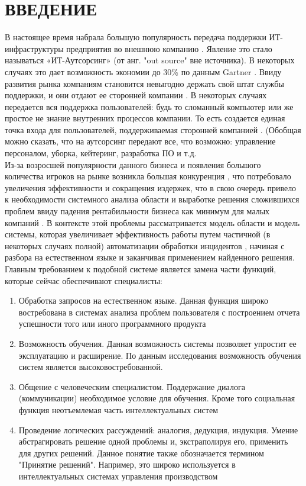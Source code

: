 \chapter*{ВВЕДЕНИЕ}							%

В настоящее время набрала большую популярность передача поддержки ИТ-инфраструктуры предприятия во внешнюю компанию \cite{StartToOutsource}. Явление это стало называться «ИТ-Аутсорсинг» (от анг. "out source" \- вне источника). В некоторых случаях это дает возможность экономии до 30\% по данным Gartner \cite{OutsourceIT}. Ввиду развития рынка компаниям становится невыгодно держать свой штат службы поддержки, и они отдают ее сторонней компании \cite{OutsourceEff}. В некоторых случаях передается вся поддержка пользователей: будь то сломанный компьютер или же простое не знание внутренних процессов компании. То есть создается единая точка входа для пользователей, поддерживаемая сторонней компанией \cite{OutsourceSD}. (Обобщая можно сказать, что на аутсорсинг передают все, что возможно: управление персоналом, уборка, кейтеринг, разработка ПО \cite{OutsourceSoft} и т.д. \\
Из-за возросшей популярности данного бизнеса и появления большого количества игроков на рынке возникла большая конкуренция \cite{AUTOS-1}, что потребовало увеличения эффективности и сокращения издержек, что в свою очередь привело к необходимости системного анализа области и выработке решения сложившихся проблем \cite{AUTOM-1} ввиду падения рентабильности бизнеса как минимум для малых компаний \cite{OUTSOURCE-RENT} \cite{OutsourceEff}. В контексте этой проблемы рассматривается модель области и модель системы, которая увеличивает эффективность работы путем частичной (в некоторых случаях полной) автоматизации обработки инцидентов \cite{SDAUTOM}, начиная с разбора на естественном языке и заканчивая применением найденного решения. \\
Главным требованием к подобной системе является замена части функций, которые сейчас обеспечивают специалисты:
\begin{enumerate}
  \item Обработка запросов на естественном языке. Данная функция широко востребована в системах анализа проблем пользователя с построением отчета успешности того или иного программного продукта \cite{TUTUB-1}
  \item Возможность обучения. Данная возможность системы позволяет упростит ее эксплуатацию и расширение. По данным исследования \cite{LEARN-1} возможность обучения систем является высоковостребованной.
  \item Общение с человеческим специалистом. Поддержание диалога (коммуникации) необходимое условие для обучения. Кроме того социальная функция неотъемлемая часть интеллектуальных систем \cite{LEARN-2}
  \item Проведение логических рассуждений: аналогия, дедукция, индукция. Умение абстрагировать решение одной проблемы и, экстраполируя его, применить для других решений. Данное понятие также обозначается термином "Принятие решений". Например, это широко используется в интеллектуальных системах управления производством \cite{LEARN-3}
\end{enumerate}

